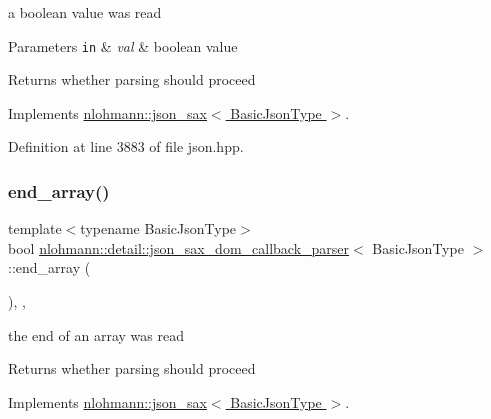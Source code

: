 a boolean value was read 


\begin{DoxyParams}[1]{Parameters}
\mbox{\tt in}  & {\em val} & boolean value \\
\hline
\end{DoxyParams}
\begin{DoxyReturn}{Returns}
whether parsing should proceed 
\end{DoxyReturn}


Implements \hyperlink{structnlohmann_1_1json__sax_a82ed080814fa656191a537284bb0c575}{nlohmann\+::json\+\_\+sax$<$ Basic\+Json\+Type $>$}.



Definition at line 3883 of file json.\+hpp.

\mbox{\label{classnlohmann_1_1detail_1_1json__sax__dom__callback__parser_ad708f4730851caff42097dc59e610e6d}} 
\subsubsection{\texorpdfstring{end\+\_\+array()}{end\_array()}}
{\footnotesize\ttfamily template$<$typename Basic\+Json\+Type$>$ \\
bool \hyperlink{classnlohmann_1_1detail_1_1json__sax__dom__callback__parser}{nlohmann\+::detail\+::json\+\_\+sax\+\_\+dom\+\_\+callback\+\_\+parser}$<$ Basic\+Json\+Type $>$\+::end\+\_\+array (\begin{DoxyParamCaption}{ }\end{DoxyParamCaption})\hspace{0.3cm}{\ttfamily [inline]}, {\ttfamily [override]}, {\ttfamily [virtual]}}



the end of an array was read 

\begin{DoxyReturn}{Returns}
whether parsing should proceed 
\end{DoxyReturn}


Implements \hyperlink{structnlohmann_1_1json__sax_a235ee975617f28e6a996d1e36a282312}{nlohmann\+::json\+\_\+sax$<$ Basic\+Json\+Type $>$}.



